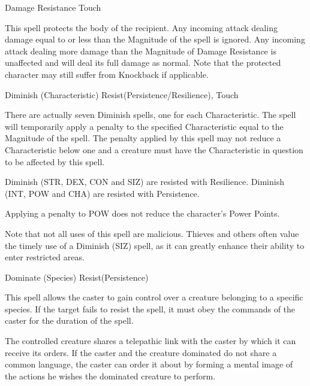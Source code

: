 \begin{rpg-spell}
{Damage Resistance}
{Touch}

This spell protects the body of the recipient. Any incoming attack dealing damage equal to or less than the Magnitude of the spell is ignored. Any incoming attack dealing more damage than the Magnitude of Damage Resistance is unaffected and will deal its full damage as normal. Note that the protected character may still suffer from Knockback if applicable. 
\end{rpg-spell}


\begin{rpg-spell}
{Diminish (Characteristic)}
{Resist(Persistence/Resilience), Touch}

There are actually seven Diminish spells, one for each Characteristic. The spell will temporarily apply a penalty to the specified Characteristic equal to the Magnitude of the spell. The penalty applied by this spell may not reduce a Characteristic below one and a creature must have the Characteristic in question to be affected by this spell. 

Diminish (STR, DEX, CON and SIZ) are resisted with Resilience. Diminish (INT, POW and CHA) are resisted with Persistence. 

Applying a penalty to POW does not reduce the character’s Power Points.

Note that not all uses of this spell are malicious. Thieves and others often value the timely use of a Diminish (SIZ) spell, as it can greatly enhance their ability to enter restricted areas. 
\end{rpg-spell}


\begin{rpg-spell}
{Dominate (Species)}
{Resist(Persistence)}

This spell allows the caster to gain control over a creature belonging to a specific species. If the target fails to resist the spell, it must obey the commands of the caster for the duration of the spell. 

The controlled creature shares a telepathic link with the caster by which it can receive its orders. If the caster and the creature dominated do not share a common language, the caster can order it about by forming a mental image of the actions he wishes the dominated creature to perform.
\end{rpg-spell}


